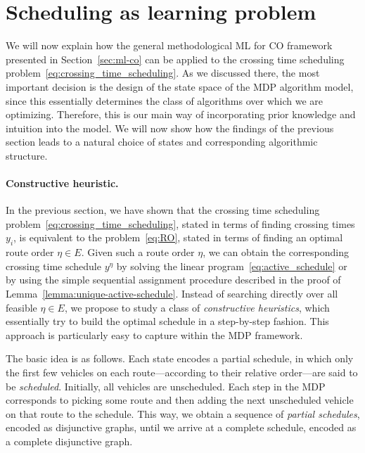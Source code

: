 \documentclass[a4paper]{report}
\theoremstyle{definition}
\theoremstyle{plain}
\begin{document}
\clearpage

\section{Scheduling as learning problem}\label{sec:seq-modeling}

We will now explain how the general methodological ML for CO framework presented
in Section~\ref{sec:ml-co} can be applied to the crossing time scheduling
problem~\eqref{eq:crossing_time_scheduling}.
%
As we discussed there, the most important decision is the design of the state
space of the MDP algorithm model, since this essentially determines the class of
algorithms over which we are optimizing. Therefore, this is our main way of
incorporating prior knowledge and intuition into the model.
%
We will now show how the findings of the previous section leads to a natural
choice of states and corresponding algorithmic structure.

\paragraph{Constructive heuristic.}
In the previous section, we have shown that the crossing time scheduling
problem~\eqref{eq:crossing_time_scheduling}, stated in terms of finding crossing
times $y_i$, is equivalent to the problem~\eqref{eq:RO}, stated in terms of finding an
optimal route order $\eta \in E$. Given such a route order $\eta$, we can obtain the
corresponding crossing time schedule $y^\eta$ by solving the linear program~\eqref{eq:active_schedule} or
by using the simple sequential assignment procedure described in the proof of
Lemma~\ref{lemma:unique-active-schedule}.
%
Instead of searching directly over all feasible $\eta \in E$, we propose to study a
class of \emph{constructive heuristics}, which essentially try to build the optimal
schedule in a step-by-step fashion. This approach is particularly easy to
capture within the MDP framework.

The basic idea is as follows.
%
Each state encodes a partial schedule, in which only the first few vehicles on
each route---according to their relative order---are said to be
\emph{scheduled}.
%
Initially, all vehicles are unscheduled.
%
Each step in the MDP corresponds to picking some route and then adding the next
unscheduled vehicle on that route to the schedule.
%
This way, we obtain a sequence of \emph{partial schedules}, encoded as
disjunctive graphs, until we arrive at a complete schedule, encoded as a
complete disjunctive graph.
\end{document}
